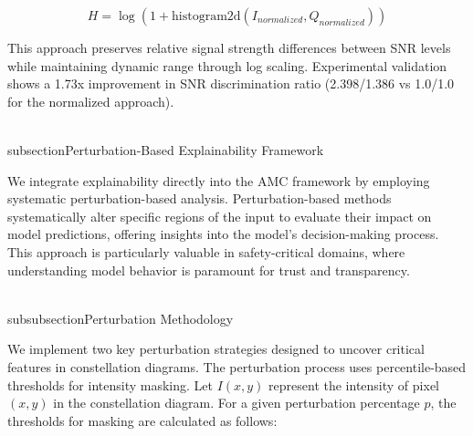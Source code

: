 \documentclass{ELSP}
\begin{document}
\begin{equation}
H = \log(1 + \text{histogram2d}(I_{normalized}, Q_{normalized}))
\end{equation}

This approach preserves relative signal strength differences between SNR levels while maintaining dynamic range through log scaling. Experimental validation shows a 1.73x improvement in SNR discrimination ratio (2.398/1.386 vs 1.0/1.0 for the normalized approach).

\\subsection{Perturbation-Based Explainability Framework}

We integrate explainability directly into the AMC framework by employing systematic perturbation-based analysis. Perturbation-based methods systematically alter specific regions of the input to evaluate their impact on model predictions, offering insights into the model's decision-making process. This approach is particularly valuable in safety-critical domains, where understanding model behavior is paramount for trust and transparency.

\\subsubsection{Perturbation Methodology}

We implement two key perturbation strategies designed to uncover critical features in constellation diagrams. The perturbation process uses percentile-based thresholds for intensity masking. Let $I(x,y)$ represent the intensity of pixel $(x,y)$ in the constellation diagram. For a given perturbation percentage $p$, the thresholds for masking are calculated as follows:
\end{document}
